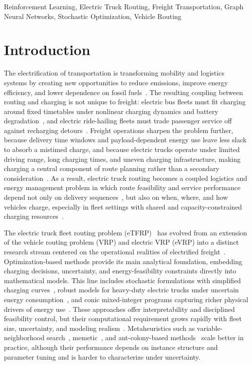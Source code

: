 \documentclass[journal]{IEEEtran}
\begin{document}
\begin{IEEEkeywords}
Reinforcement Learning, Electric Truck Routing, Freight Transportation, Graph Neural Networks, Stochastic Optimization, Vehicle Routing
\end{IEEEkeywords}

\IEEEpeerreviewmaketitle

\section{Introduction}

The electrification of transportation is transforming mobility and logistics systems by creating new opportunities to reduce emissions, improve energy efficiency, and lower dependence on fossil fuels~\cite{ZHANG2022103152}. The resulting coupling between routing and charging is not unique to freight: electric bus fleets must fit charging around fixed timetables under nonlinear charging dynamics and battery degradation~\cite{jin2024buses}, and electric ride-hailing fleets must trade passenger service off against recharging detours~\cite{shi2020ridehailing}. Freight operations sharpen the problem further, because delivery time windows and payload-dependent energy use leave less slack to absorb a mistimed charge, and because electric trucks operate under limited driving range, long charging times, and uneven charging infrastructure, making charging a central component of route planning rather than a secondary consideration~\cite{KUCUKOGLU2021107650}. As a result, electric truck routing becomes a coupled logistics and energy management problem in which route feasibility and service performance depend not only on delivery sequences~\cite{osti_1615213}, but also on when, where, and how vehicles charge, especially in fleet settings with shared and capacity-constrained charging resources~\cite{BRAGIN2024104494}. 

The electric truck fleet routing problem (eTFRP)~\cite{ziyan2025} has evolved from an extension of the vehicle routing problem (VRP) and electric VRP (eVRP) into a distinct research stream centered on the operational realities of electrified freight~\cite{cataldo_2023}. Optimization-based methods provide its main analytical foundation, embedding charging decisions, uncertainty, and energy-feasibility constraints directly into mathematical models. This line includes stochastic formulations with simplified charging curves~\cite{SPINELLI2026105480}, robust models for heavy-duty electric trucks under uncertain energy consumption~\cite{AMIRI2023109108}, and conic mixed-integer programs capturing richer physical drivers of energy use~\cite{WANG2024123407}. These approaches offer interpretability and disciplined feasibility control, but their computational requirement grows rapidly with fleet size, uncertainty, and modeling realism~\cite{lara_electric_2020}. Metaheuristics such as variable-neighborhood search~\cite{euchi_hybrid_2023}, memetic~\cite{dong_dynamic_2023}, and ant-colony-based methods~\cite{9409782} scale better in practice, although their performance depends on instance structure and parameter tuning and is harder to characterize under uncertainty.
\end{document}

